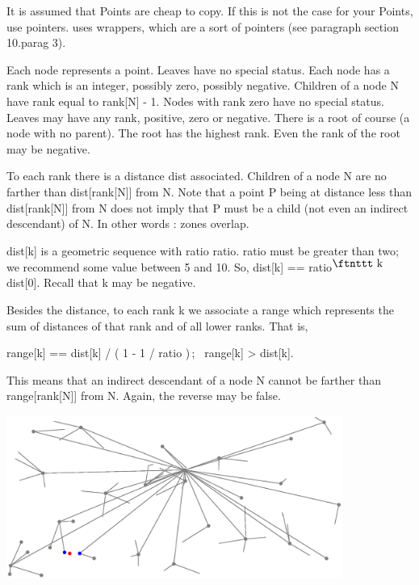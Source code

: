 It is assumed that {\codett Point}s are cheap to copy.
If this is not the case for your {\codett Point}s, use pointers.
{\ManiFEM} uses wrappers, which are a sort of pointers (see paragraph
\numb section 10.\numb parag 3).

Each node represents a point.
Leaves have no special status.
Each node has a rank which is an integer, possibly zero, possibly negative.
Children of a node {\codett N} have rank equal to {\codett rank[N] - 1}.
Nodes with rank zero have no special status.
Leaves may have any rank, positive, zero or negative.
There is a {\codett root} of course (a node with no parent).
The root has the highest rank.
Even the rank of the root may be negative.

To each rank there is a distance {\codett dist} associated.
Children of a node {\codett N} are no farther than {\codett dist[rank[N]]} from {\codett N}.
Note that a point {\codett P} being at distance less than {\codett dist[rank[N]]} from
{\codett N} does not imply that {\codett P} must be a child (not even an indirect descendant)
of {\codett N}.
In other words : zones overlap.

{\codett dist[k]} is a geometric sequence with ratio {\codett ratio}.
{\codett ratio} must be greater than two; we recommend some value between 5 and 10.
So, {\codett dist[k] == ratio}$^{\hbox{\ftnttt k }}${\codett dist[0]}.
Recall that {\codett k} may be negative.

Besides the {\codett dist}ance, to each rank {\codett k} we associate a {\codett range}
which represents the sum of distances of that rank and of all lower ranks.
That is,
\smallskip\centerline
{{\codett range[k] == dist[k] / ( 1 - 1 / ratio )$\,$}; \ {\codett range[k] > dist[k]}.}
\smallskip\noindent
This means that an indirect descendant of a node {\codett N} cannot be farther than
{\codett range[rank[N]]} from {\codett N}.
Again, the reverse may be false.

\centerline{\includegraphics[width=110mm]{metric-tree.eps}}

